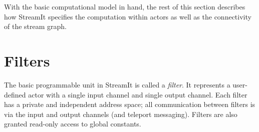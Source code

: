 With the basic computational model in hand, the rest of this section
describes how StreamIt specifies the computation within actors as well
as the connectivity of the stream graph.

\section{Filters}
\label{sec:filters}

The basic programmable unit in StreamIt is called a {\it filter}.  It
represents a user-defined actor with a single input channel and single
output channel.  Each filter has a private and independent address
space; all communication between filters is via the input and output
channels (and teleport messaging).  Filters are also granted read-only
access to global constants.

